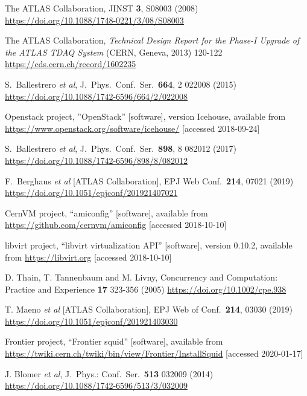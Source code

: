 \documentclass{webofc}
\begin{document}
\begin{thebibliography}{}
   The ATLAS Collaboration,
   JINST \textbf{3}, S08003 (2008)
   \url{https://doi.org/10.1088/1748-0221/3/08/S08003}

    The ATLAS Collaboration, \textit{Technical Design Report for the Phase-I
    Upgrade of the ATLAS TDAQ System} (CERN, Geneva, 2013) 120-122
    \url{https://cds.cern.ch/record/1602235}

    S.~Ballestrero \textit{et al},
    J.\ Phys.\ Conf.\ Ser.\  \textbf{664}, 2 022008 (2015)
    \url{https://doi.org/10.1088/1742-6596/664/2/022008}

    Openstack project, ”OpenStack” [software], version Icehouse, available from
    \url{https://www.openstack.org/software/icehouse/} [accessed 2018-09-24]

    S.~Ballestrero \textit{et al},
    J.\ Phys.\ Conf.\ Ser.\  \textbf{898},  8 082012 (2017)
    \url{https://doi.org/10.1088/1742-6596/898/8/082012}

    F.~Berghaus \textit{et al} [ATLAS Collaboration],
    EPJ Web Conf.\ \textbf{214}, 07021 (2019)
    \url{https://doi.org/10.1051/epjconf/201921407021}

    CernVM project, ``amiconfig'' [software], available from
    \url{https://github.com/cernvm/amiconfig} [accessed 2018-10-10]

    libvirt project, ``libvirt virtualization API'' [software], version 0.10.2,
    available from \url{https://libvirt.org} [accessed 2018-10-10]

    D. Thain, T. Tannenbaum and M. Livny,
    Concurrency and Computation: Practice and Experience \textbf{17} 323-356
    (2005)
    \url{https://doi.org/10.1002/cpe.938}

    T. Maeno \textit{et al} [ATLAS Collaboration],
    EPJ Web of Conf.\ \textbf{214}, 03030 (2019)
    \url{https://doi.org/10.1051/epjconf/201921403030}

    Frontier project, ``Frontier squid'' [software], available from
    \url{https://twiki.cern.ch/twiki/bin/view/Frontier/InstallSquid}
    [accessed 2020-01-17]

    J. Blomer \textit{et al},
    J.\ Phys.: Conf.\ Ser.\ \textbf{513} 032009 (2014)
    \url{https://doi.org/10.1088/1742-6596/513/3/032009}

\end{thebibliography}
\end{document}
